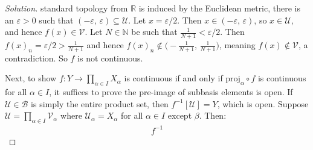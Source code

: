 \documentclass{article}
\theoremstyle{normal}
\begin{document}
\begin{proof}[Solution]
        standard topology from $\mathbb{R}$ is induced by the Euclidean metric,
        there is an $\varepsilon>0$ such that
        $(-\varepsilon,\,\varepsilon)\subseteq\mathcal{U}$. Let
        $x=\varepsilon/2$. Then $x\in(-\varepsilon,\,\varepsilon)$, so
        $x\in\mathcal{U}$, and hence $f(x)\in\mathcal{V}$. Let $N\in\mathbb{N}$
        be such that $\frac{1}{N+1}<\varepsilon/2$. Then
        $f(x)_{n}=\varepsilon/2>\frac{1}{N+1}$ and hence
        $f(x)_{n}\notin\big(-\frac{1}{N+1},\,\frac{1}{N+1}\big)$, meaning
        $f(x)\notin\mathcal{V}$, a contradiction. So $f$ is not continuous.
        \par\hfill\par
        Next, to show $f:Y\rightarrow\prod_{\alpha\in{I}}X_{\alpha}$ is
        continuous if and only if $\textrm{proj}_{\alpha}\circ{f}$ is continuous
        for all $\alpha\in{I}$, it suffices to prove the pre-image of subbasis
        elements is open. If $\mathcal{U}\in\mathcal{B}$ is simply the entire
        product set, then $f^{-1}[\mathcal{U}]=Y$, which is open. Suppose
        $\mathcal{U}=\prod_{\alpha\in{I}}\mathcal{V}_{\alpha}$ where
        $\mathcal{U}_{\alpha}=X_{\alpha}$ for all $\alpha\in{I}$ except
        $\beta$. Then:
        \begin{align}
            f^{-1}
        \end{align}
    \end{proof}
    \clearpage
    \color{blue}
\end{document}
